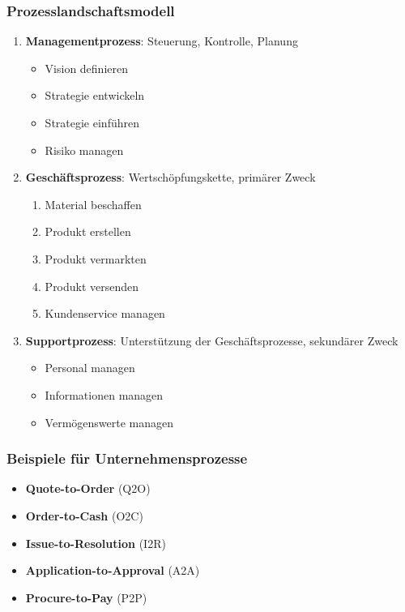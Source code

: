 \documentclass{article}
\begin{document}
\subsubsection{Prozesslandschaftsmodell}
\begin{enumerate}
  \item \textbf{Managementprozess}: Steuerung, Kontrolle, Planung
        \begin{itemize}
          \item Vision definieren
          \item Strategie entwickeln
          \item Strategie einführen
          \item Risiko managen
        \end{itemize}
  \item \textbf{Geschäftsprozess}: Wertschöpfungskette, primärer Zweck
        \begin{enumerate}
          \item Material beschaffen
          \item Produkt erstellen
          \item Produkt vermarkten
          \item Produkt versenden
          \item Kundenservice managen
        \end{enumerate}
  \item \textbf{Supportprozess}: Unterstützung der Geschäftsprozesse, sekundärer Zweck
        \begin{itemize}
          \item Personal managen
          \item Informationen managen
          \item Vermögenswerte managen
        \end{itemize}
\end{enumerate}

\subsubsection{Beispiele für Unternehmensprozesse}
\begin{itemize}
  \item \textbf{Quote-to-Order} (Q2O)
  \item \textbf{Order-to-Cash} (O2C)
  \item \textbf{Issue-to-Resolution} (I2R)
  \item \textbf{Application-to-Approval} (A2A)
  \item \textbf{Procure-to-Pay} (P2P)
\end{itemize}
\end{document}
